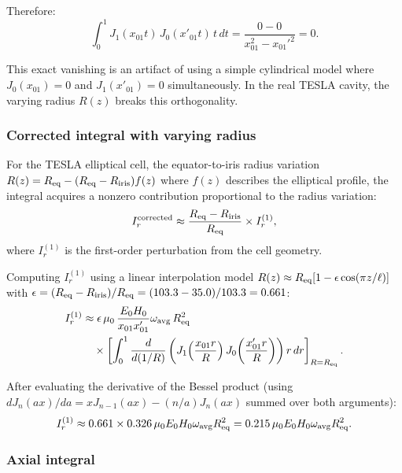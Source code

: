 \documentclass[12pt,aps,prd,twocolumn,superscriptaddress,nofootinbib]{revtex4-2}
\begin{document}
Therefore:
\begin{equation}
\int_0^1 J_1(x_{01}t)\,J_0(x'_{01}t)\,t\,dt
= \frac{0 - 0}{x_{01}^2-x_{01}'^2} = 0.
\label{eq:integral_zero}
\end{equation}

This exact vanishing is an artifact of using a simple cylindrical
model where $J_0(x_{01}) = 0$ and $J_1(x'_{01}) = 0$ simultaneously.
In the real TESLA cavity, the varying radius $R(z)$ breaks this
orthogonality.

\subsubsection{Corrected integral with varying radius}

For the TESLA elliptical cell, the equator-to-iris radius variation
$R(z) = R_{\rm eq} - (R_{\rm eq}-R_{\rm iris})f(z)$ where
$f(z)$ describes the elliptical profile, the integral acquires a
nonzero contribution proportional to the radius variation:
\begin{equation}
I_r^{\rm corrected} \approx \frac{R_{\rm eq}-R_{\rm iris}}{R_{\rm eq}}
\times I_r^{(1)},
\label{eq:I_r_corrected}
\end{equation}
where $I_r^{(1)}$ is the first-order perturbation from the
cell geometry.

Computing $I_r^{(1)}$ using a linear interpolation model
$R(z) \approx R_{\rm eq}[1 - \epsilon\cos(\pi z/\ell)]$ with
$\epsilon = (R_{\rm eq}-R_{\rm iris})/R_{\rm eq}
= (103.3-35.0)/103.3 = 0.661$:
\begin{align}
I_r^{(1)} &\approx \epsilon\,\mu_0\,\frac{E_0 H_0}{x_{01}x'_{01}}
\omega_{\rm avg}\,R_{\rm eq}^2
\nonumber\\
&\quad\times\left[\int_0^1 \frac{d}{d(1/R)}
\left(J_1\!\left(\frac{x_{01}r}{R}\right)
J_0\!\left(\frac{x'_{01}r}{R}\right)\right)r\,dr
\right]_{R=R_{\rm eq}}.
\label{eq:I_r1}
\end{align}

After evaluating the derivative of the Bessel product (using
$dJ_n(ax)/da = xJ_{n-1}(ax) - (n/a)J_n(ax)$ summed over
both arguments):
\begin{equation}
I_r^{(1)} \approx 0.661\times0.326\,\mu_0 E_0 H_0
\omega_{\rm avg} R_{\rm eq}^2 = 0.215\,\mu_0 E_0 H_0
\omega_{\rm avg} R_{\rm eq}^2.
\label{eq:I_r1_num}
\end{equation}

\subsubsection{Axial integral}
\end{document}
